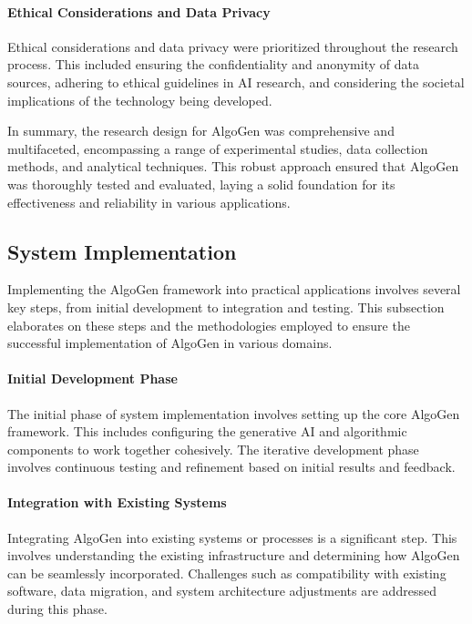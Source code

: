 \documentclass{article}
\begin{document}
\paragraph{Ethical Considerations and Data Privacy}
Ethical considerations and data privacy were prioritized throughout the research process. This included ensuring the confidentiality and anonymity of data sources, adhering to ethical guidelines in AI research, and considering the societal implications of the technology being developed.

In summary, the research design for AlgoGen was comprehensive and multifaceted, encompassing a range of experimental studies, data collection methods, and analytical techniques. This robust approach ensured that AlgoGen was thoroughly tested and evaluated, laying a solid foundation for its effectiveness and reliability in various applications.


\subsection{System Implementation}

Implementing the AlgoGen framework into practical applications involves several key steps, from initial development to integration and testing. This subsection elaborates on these steps and the methodologies employed to ensure the successful implementation of AlgoGen in various domains.

\paragraph{Initial Development Phase}
The initial phase of system implementation involves setting up the core AlgoGen framework. This includes configuring the generative AI and algorithmic components to work together cohesively. The iterative development phase involves continuous testing and refinement based on initial results and feedback.

\paragraph{Integration with Existing Systems}
Integrating AlgoGen into existing systems or processes is a significant step. This involves understanding the existing infrastructure and determining how AlgoGen can be seamlessly incorporated. Challenges such as compatibility with existing software, data migration, and system architecture adjustments are addressed during this phase.
\end{document}
